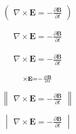 \documentclass[]{article}
\begin{document}
\[\begin{pmatrix}
\nabla \times \mathbf{E} = - \frac{\partial \mathbf{B}}{\partial t}
\end{pmatrix}\]

\[\begin{smallmatrix}
\nabla \times \mathbf{E} = - \frac{\partial \mathbf{B}}{\partial t}
\end{smallmatrix}\]

\[\begin{split}
\nabla \times \mathbf{E} = - \frac{\partial \mathbf{B}}{\partial t}
\end{split}\]

\[\begin{subarray}
\nabla \times \mathbf{E} = - \frac{\partial \mathbf{B}}{\partial t}
\end{subarray}\]

\[\begin{Vmatrix}
\nabla \times \mathbf{E} = - \frac{\partial \mathbf{B}}{\partial t}
\end{Vmatrix}\]

\[\begin{vmatrix}
\nabla \times \mathbf{E} = - \frac{\partial \mathbf{B}}{\partial t}
\end{vmatrix}\]
\end{document}

